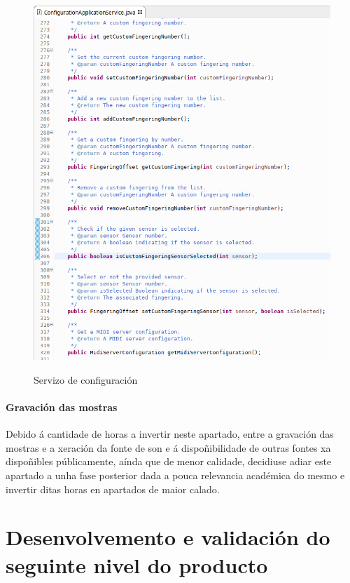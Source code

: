    \begin{figure}[htbp]
    \centering
    \includegraphics[scale=0.6, keepaspectratio=true]{./imagenes/servizo-configuracion-7.png} \\
    \caption{Servizo de configuración}
    \label{figura:ServizoConfiguracion7}
   \end{figure}

   \paragraph{Gravación das mostras}
   
   Debido á cantidade de horas a invertir neste apartado, entre a gravación das
   mostras e a xeración da fonte de son e á dispoñibilidade de outras fontes xa
   dispoñibles públicamente, aínda que de menor calidade, decidiuse adiar este
   apartado a unha fase posterior dada a pouca relevancia académica do mesmo e
   invertir ditas horas en apartados de maior calado.

\section{Desenvolvemento e validación do seguinte nivel do producto}

